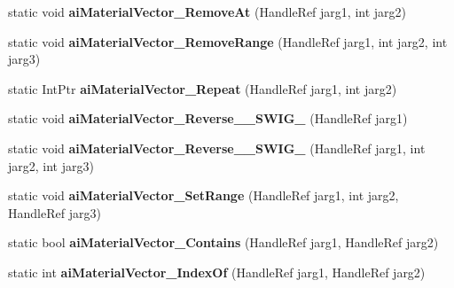 \begin{DoxyCompactItemize}
\item 
\hypertarget{class_assimp_p_i_n_v_o_k_e_aca5df81b374ccdc7014ea79fb40cd62e}{static void {\bfseries ai\+Material\+Vector\+\_\+\+Remove\+At} (Handle\+Ref jarg1, int jarg2)}\label{class_assimp_p_i_n_v_o_k_e_aca5df81b374ccdc7014ea79fb40cd62e}

\item 
\hypertarget{class_assimp_p_i_n_v_o_k_e_a7cf3e73e63f1673de2806bf0a63c6b85}{static void {\bfseries ai\+Material\+Vector\+\_\+\+Remove\+Range} (Handle\+Ref jarg1, int jarg2, int jarg3)}\label{class_assimp_p_i_n_v_o_k_e_a7cf3e73e63f1673de2806bf0a63c6b85}

\item 
\hypertarget{class_assimp_p_i_n_v_o_k_e_a9687646b79361e6b3bc796c91455170a}{static Int\+Ptr {\bfseries ai\+Material\+Vector\+\_\+\+Repeat} (Handle\+Ref jarg1, int jarg2)}\label{class_assimp_p_i_n_v_o_k_e_a9687646b79361e6b3bc796c91455170a}

\item 
\hypertarget{class_assimp_p_i_n_v_o_k_e_a9733e33dcfcdd3e4ecf2bec9a7548ca4}{static void {\bfseries ai\+Material\+Vector\+\_\+\+Reverse\+\_\+\+\_\+\+S\+W\+I\+G\+\_} (Handle\+Ref jarg1)}\label{class_assimp_p_i_n_v_o_k_e_a9733e33dcfcdd3e4ecf2bec9a7548ca4}

\item 
\hypertarget{class_assimp_p_i_n_v_o_k_e_a2a7e85571817909286e15d30508cae55}{static void {\bfseries ai\+Material\+Vector\+\_\+\+Reverse\+\_\+\+\_\+\+S\+W\+I\+G\+\_} (Handle\+Ref jarg1, int jarg2, int jarg3)}\label{class_assimp_p_i_n_v_o_k_e_a2a7e85571817909286e15d30508cae55}

\item 
\hypertarget{class_assimp_p_i_n_v_o_k_e_af50db1bcd95d306e9af737f183b1d670}{static void {\bfseries ai\+Material\+Vector\+\_\+\+Set\+Range} (Handle\+Ref jarg1, int jarg2, Handle\+Ref jarg3)}\label{class_assimp_p_i_n_v_o_k_e_af50db1bcd95d306e9af737f183b1d670}

\item 
\hypertarget{class_assimp_p_i_n_v_o_k_e_a30561b6472cba0659f93ad1548d2947a}{static bool {\bfseries ai\+Material\+Vector\+\_\+\+Contains} (Handle\+Ref jarg1, Handle\+Ref jarg2)}\label{class_assimp_p_i_n_v_o_k_e_a30561b6472cba0659f93ad1548d2947a}

\item 
\hypertarget{class_assimp_p_i_n_v_o_k_e_a28acf9ee53981abd4add7e5d3148940b}{static int {\bfseries ai\+Material\+Vector\+\_\+\+Index\+Of} (Handle\+Ref jarg1, Handle\+Ref jarg2)}\label{class_assimp_p_i_n_v_o_k_e_a28acf9ee53981abd4add7e5d3148940b}


\end{DoxyCompactItemize}
